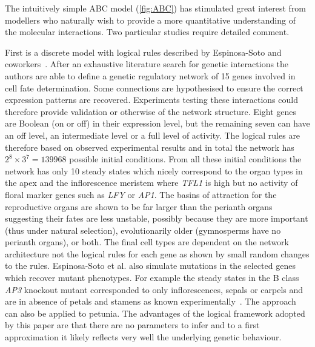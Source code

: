 The intuitively simple ABC model (\autoref{fig:ABC}) has stimulated great interest from modellers who naturally wish to provide a more quantitative understanding of the molecular interactions.
Two particular studies require detailed comment.

First is a discrete model with logical rules described by Espinosa-Soto and coworkers~\cite{espinosa2004}.
After an exhaustive literature search for genetic interactions the authors are able to define a genetic regulatory network of 15 genes involved in cell fate determination.
Some connections are hypothesised to ensure the correct expression patterns are recovered.
Experiments testing these interactions could therefore provide validation or otherwise of the network structure.
Eight genes are Boolean (on or off) in their expression level, but the remaining seven can have an off level, an intermediate level or a full level of activity.
The logical rules are therefore based on observed experimental results and in total the network has $2^8 \times 3^7 = 139968$ possible initial conditions.
From all these initial conditions the network has only 10 steady states which nicely correspond to the organ types in the apex and the inflorescence meristem where \emph{TFL1} is high but no activity of floral marker genes such as \emph{LFY} or \emph{AP1}.
The basins of attraction for the reproductive organs are shown to be far larger than the perianth organs suggesting their fates are less unstable, possibly because they are more important (thus under natural selection), evolutionarily older (gymnosperms have no perianth organs), or both.
The final cell types are dependent on the network architecture not the logical rules for each gene as shown by small random changes to the rules.
Espinosa-Soto et al. also simulate mutations in the selected genes which recover mutant phenotypes.
For example the steady states in the B class \emph{AP3} knockout mutant corresponded to only inflorescences, sepals or carpels and are in absence of petals and stamens as known experimentally~\cite{coen1991,jack1992}.
The approach can also be applied to petunia.
The advantages of the logical framework adopted by this paper are that there are no parameters to infer and to a first approximation it likely reflects very well the underlying genetic behaviour.

